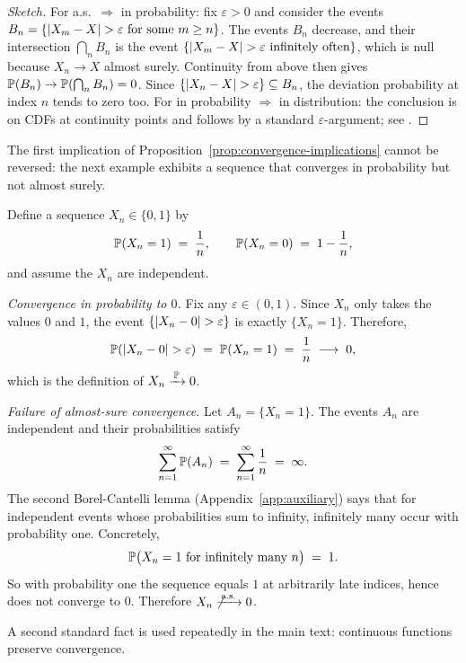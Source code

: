 \begin{proof}[Sketch]
For a.s.\ \(\Rightarrow\) in probability: fix \(\varepsilon > 0\) and consider the events \(B_n = \{\lvert X_m - X\rvert > \varepsilon \text{ for some } m \ge n\}\). The events \(B_n\) decrease, and their intersection \(\bigcap_n B_n\) is the event \(\{\lvert X_m - X\rvert > \varepsilon \text{ infinitely often}\}\), which is null because \(X_n \to X\) almost surely. Continuity from above then gives \(\mathbb{P}(B_n) \to \mathbb{P}(\bigcap_n B_n) = 0\). Since \(\{\lvert X_n - X\rvert > \varepsilon\} \subseteq B_n\), the deviation probability at index \(n\) tends to zero too. For in probability \(\Rightarrow\) in distribution: the conclusion is on CDFs at continuity points and follows by a standard \(\varepsilon\)-argument; see \citet[][Thm.~5.5.12]{Casella2002}.
\end{proof}

The first implication of Proposition~\ref{prop:convergence-implications} cannot be reversed: the next example exhibits a sequence that converges in probability but not almost surely.

\begin{example}\label{ex:p-not-as}
Define a sequence \(X_n \in \{0, 1\}\) by
\[
  \mathbb{P}(X_n = 1) \;=\; \frac{1}{n}, \qquad \mathbb{P}(X_n = 0) \;=\; 1 - \frac{1}{n},
\]
and assume the \(X_n\) are independent.

\emph{Convergence in probability to \(0\).} Fix any \(\varepsilon \in (0, 1)\). Since \(X_n\) only takes the values \(0\) and \(1\), the event \(\{\lvert X_n - 0\rvert > \varepsilon\}\) is exactly \(\{X_n = 1\}\). Therefore,
\[
  \mathbb{P}(\lvert X_n - 0\rvert > \varepsilon) \;=\; \mathbb{P}(X_n = 1) \;=\; \frac{1}{n} \;\longrightarrow\; 0,
\]
which is the definition of \(X_n \xrightarrow{\,\mathbb{P}\,} 0\).

\emph{Failure of almost-sure convergence.} Let \(A_n = \{X_n = 1\}\). The events \(A_n\) are independent and their probabilities satisfy
\[
  \sum_{n = 1}^\infty \mathbb{P}(A_n) \;=\; \sum_{n = 1}^\infty \frac{1}{n} \;=\; \infty.
\]
The second Borel-Cantelli lemma (Appendix~\ref{app:auxiliary}) says that for independent events whose probabilities sum to infinity, infinitely many occur with probability one. Concretely,
\[
  \mathbb{P}\bigl(X_n = 1 \text{ for infinitely many } n\bigr) \;=\; 1.
\]
So with probability one the sequence equals \(1\) at arbitrarily late indices, hence does not converge to \(0\). Therefore \(X_n \not\xrightarrow{\,\text{a.s.}\,} 0\).
\end{example}

A second standard fact is used repeatedly in the main text: continuous functions preserve convergence.

